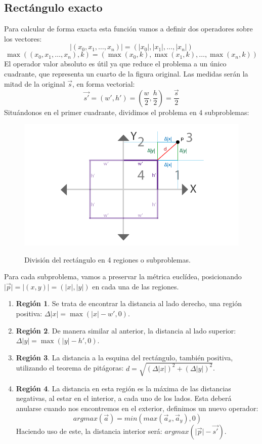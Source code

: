 \subsection{Rectángulo exacto}
Para calcular de forma exacta esta función vamos a definir dos operadores sobre los vectores:
\[\vert(x_0,x_1,\dots,x_n)\vert=(\vert x_0\vert,\vert x_1\vert,\dots,\vert x_n \vert)\]
\[\max\left((x_0,x_1,\dots,x_n), k\right)=(\max( x_0, k), \max(x_1, k),\dots, \max(x_n, k))\]
El operador valor absoluto es útil ya que reduce el problema a un único cuadrante, que representa un cuarto de la figura original. Las medidas serán la mitad de la original \(\Vec{s}\), en forma vectorial:
\[\Vec{s'}=(w', h')=\left(\dfrac{w}{2},\dfrac{h}{2}\right)=\dfrac{\Vec{s}}{2}\]
Situándonos en el primer cuadrante, dividimos el problema en 4 subproblemas:
\begin{figure}[H]
  \centering
  \captionsetup{justification=centering}%
  \includegraphics[width=1.0\textwidth]{secciones/imagenes/sdf/proofs/proof_rectangle.png}\label{fig:subproblem}
  \caption{División del rectángulo en 4 regiones o subproblemas.}
\end{figure}
Para cada subproblema, vamos a preservar la métrica euclídea, posicionando \(\vert\Vec{p}\vert=\vert(x,y)\vert=(\vert x\vert, \vert y \vert)\) en cada una de las regiones.
\begin{enumerate}
    \item \textbf{Región 1}. Se trata de encontrar la distancia al lado derecho, una región positiva: \(\Delta \vert x\vert=\max(\vert x\vert-w', 0)\).
    \item \textbf{Región 2}. De manera similar al anterior, la distancia al lado superior: \(\Delta\vert y\vert=\max(\vert y\vert-h', 0)\).
    \item \textbf{Región 3}. La distancia a la esquina del rectángulo, también positiva, utilizando el teorema de pitágoras: \(d = \sqrt{\left(\Delta \vert x\vert\right)^2+\left(\Delta \vert y\vert\right)^2}\).
    \item \textbf{Región 4}. La distancia en esta región es la máxima de las distancias negativas, al estar en el interior, a cada uno de los lados. Esta deberá anularse cuando nos encontremos en el exterior, definimos un nuevo operador:
    \[argmax(\Vec{a})=min(max(\Vec{a}_x, \Vec{a}_y), 0)\]
    Haciendo uso de este, la distancia interior será: \(argmax(\vert\Vec{p}\vert-\Vec{s'})\).
\end{enumerate}
